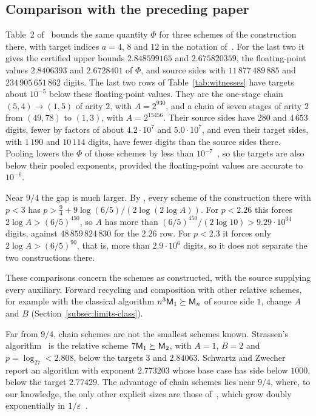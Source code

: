 \subsection{Comparison with the preceding paper}
\label{subsec:examples-comparison}

Table~2 of~\citep{FinCon26} bounds the same quantity \(\Phi\)
\citep[(10.1)]{FinCon26} for three schemes of the construction there,
with target indices \(a=4\), \(8\) and \(12\) in the notation
of~\citep{FinCon26}. For the last two it gives the certified upper
bounds \(2.848599165\) and \(2.675820359\), the floating-point values
\(2.8406393\) and \(2.6728401\) of \(\Phi\), and source sides with \(11\,877\,489\,885\) and \(234\,905\,651\,862\) digits.
The last two rows of Table~\ref{tab:witnesses} have targets about
\(10^{-5}\) below these floating-point values. They are the one-stage
chain \((5,4)\to(1,5)\) of arity \(2\), with \(A=2^{930}\), and a chain
of seven stages of arity \(2\) from \((49,78)\) to \((1,3)\), with
\(A=2^{15456}\). Their source sides have \(280\) and \(4\,653\) digits,
fewer by factors of about \(4.2\cdot10^7\) and \(5.0\cdot10^7\), and
even their target sides, with \(1\,190\) and \(10\,114\) digits, have
fewer digits than the source sides there. Pooling lowers the \(\Phi\) of
those schemes by less than \(10^{-7}\)~\citep[Section~10.2]{FinCon26},
so the targets are also below their pooled exponents, provided the
floating-point values are accurate to \(10^{-6}\).

Near \(9/4\) the gap is much larger. By
\citep[Corollary~11.2(a)]{FinCon26}, every scheme of the construction
there with \(p<3\) has \(p>\frac94+9\log(6/5)/(2\log(2\log A))\). For
\(p<2.26\) this forces \(2\log A>(6/5)^{450}\), so \(A\) has more than
\((6/5)^{450}/(2\log10)>9.29\cdot10^{34}\) digits, against
\(48\,859\,824\,830\) for the \(2.26\) row. For \(p<2.3\) it forces only
\(2\log A>(6/5)^{90}\), that is, more than \(2.9\cdot10^6\) digits, so it
does not separate the two constructions there.

These comparisons concern the schemes as constructed, with the source
supplying every auxiliary. Forward recycling and composition with other
relative schemes, for example with the classical algorithm
\(n^3\mathsf M_1\succeq\mathsf M_n\) of source side \(1\), change \(A\) and \(B\)
(Section~\ref{subsec:limits-class}).

Far from \(9/4\), chain schemes are not the smallest schemes known.
Strassen's algorithm~\citep{Str69} is the relative scheme
\(7\mathsf M_1\succeq\mathsf M_2\), with \(A=1\), \(B=2\) and \(p=\log_27<2.808\),
below the targets \(3\) and \(2.84063\). Schwartz and Zwecher~\citep{SZ26} report an algorithm
with exponent \(2.773203\) whose base case has side below \(1000\),
below the target \(2.77429\). The advantage of chain schemes lies near
\(9/4\), where, to our knowledge, the only other explicit sizes are
those of~\citep{FinCon26}, which grow doubly exponentially in
\(1/\varepsilon\)~\citep[Corollary~11.2(b)]{FinCon26}.
